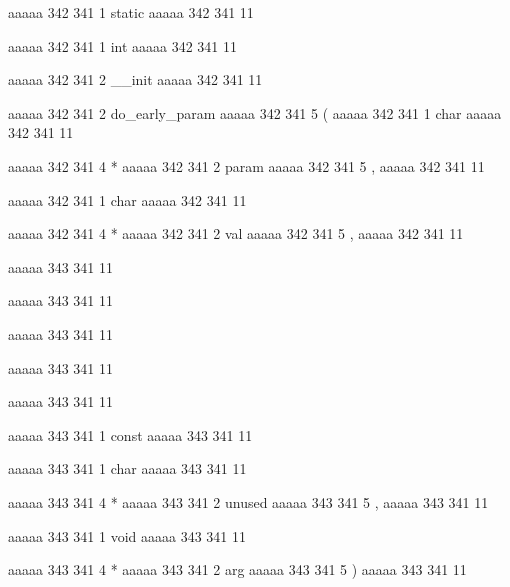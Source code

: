aaaaa 342 341
1
static
aaaaa 342 341
11
 
aaaaa 342 341
1
int
aaaaa 342 341
11
 
aaaaa 342 341
2
__init
aaaaa 342 341
11
 
aaaaa 342 341
2
do_early_param
aaaaa 342 341
5
(
aaaaa 342 341
1
char
aaaaa 342 341
11
 
aaaaa 342 341
4
*
aaaaa 342 341
2
param
aaaaa 342 341
5
,
aaaaa 342 341
11
 
aaaaa 342 341
1
char
aaaaa 342 341
11
 
aaaaa 342 341
4
*
aaaaa 342 341
2
val
aaaaa 342 341
5
,
aaaaa 342 341
11


aaaaa 343 341
11
	
aaaaa 343 341
11
	
aaaaa 343 341
11
	
aaaaa 343 341
11
	
aaaaa 343 341
11
 
aaaaa 343 341
1
const
aaaaa 343 341
11
 
aaaaa 343 341
1
char
aaaaa 343 341
11
 
aaaaa 343 341
4
*
aaaaa 343 341
2
unused
aaaaa 343 341
5
,
aaaaa 343 341
11
 
aaaaa 343 341
1
void
aaaaa 343 341
11
 
aaaaa 343 341
4
*
aaaaa 343 341
2
arg
aaaaa 343 341
5
)
aaaaa 343 341
11


